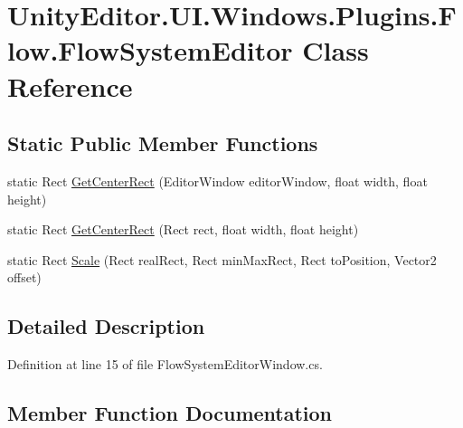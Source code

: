 \hypertarget{class_unity_editor_1_1_u_i_1_1_windows_1_1_plugins_1_1_flow_1_1_flow_system_editor}{}\section{Unity\+Editor.\+U\+I.\+Windows.\+Plugins.\+Flow.\+Flow\+System\+Editor Class Reference}
\label{class_unity_editor_1_1_u_i_1_1_windows_1_1_plugins_1_1_flow_1_1_flow_system_editor}
\subsection*{Static Public Member Functions}
\begin{DoxyCompactItemize}
\item 
static Rect \hyperlink{class_unity_editor_1_1_u_i_1_1_windows_1_1_plugins_1_1_flow_1_1_flow_system_editor_af6b2e48c0e1f05f019c286bf91664451}{Get\+Center\+Rect} (Editor\+Window editor\+Window, float width, float height)
\item 
static Rect \hyperlink{class_unity_editor_1_1_u_i_1_1_windows_1_1_plugins_1_1_flow_1_1_flow_system_editor_a541d130cfa1553f068e9d9fa221bb84a}{Get\+Center\+Rect} (Rect rect, float width, float height)
\item 
static Rect \hyperlink{class_unity_editor_1_1_u_i_1_1_windows_1_1_plugins_1_1_flow_1_1_flow_system_editor_ac54ba0ef272db0b0642153bf83fcfadb}{Scale} (Rect real\+Rect, Rect min\+Max\+Rect, Rect to\+Position, Vector2 offset)
\end{DoxyCompactItemize}


\subsection{Detailed Description}


Definition at line 15 of file Flow\+System\+Editor\+Window.\+cs.



\subsection{Member Function Documentation}
\hypertarget{class_unity_editor_1_1_u_i_1_1_windows_1_1_plugins_1_1_flow_1_1_flow_system_editor_af6b2e48c0e1f05f019c286bf91664451}{}
